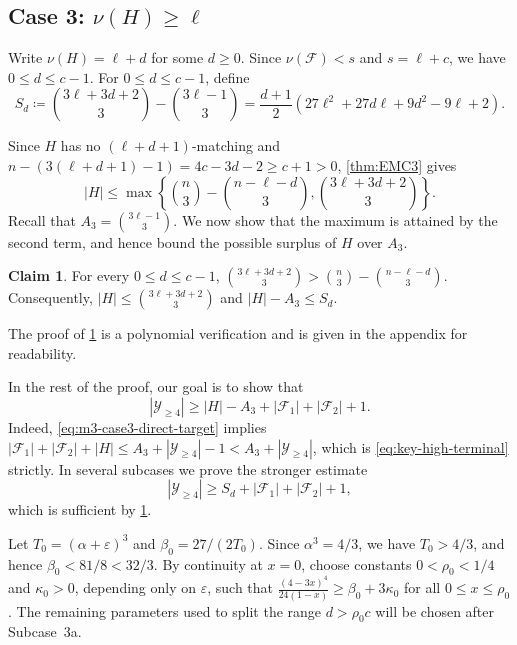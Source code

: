 \documentclass[10pt,a4paper]{article}
\numberwithin{equation}{section}
\theoremstyle{definition}
\newtheorem{claim}[claim]{Claim}
\newcommand{\F}{\mathcal F}
\newcommand{\Y}{\mathcal Y}
\begin{document}
\subsection{Case 3: $\nu(H)\ge\ell$}


Write $\nu(H)=\ell+d$ for some $d\ge0$.
Since $\nu(\F)<s$ and $s=\ell+c$, we have $0\le d\le c-1$.
For $0\le d\le c-1$, define
\begin{equation}\label{eq:Sd-exact-expansion}
        S_d\coloneqq\binom{3\ell+3d+2}{3}-\binom{3\ell-1}{3}
        =\frac{d+1}{2}
        \left(27\ell^2+27d\ell+9d^2-9\ell+2\right).
\end{equation}

Since $H$ has no $(\ell+d+1)$-matching and $n-(3(\ell+d+1)-1)=4c-3d-2\ge c+1>0$, \cref{thm:EMC3} gives
\begin{equation}\label{equ:H-maximum}
        |H|\le
        \max\left\{
        \binom n3-\binom{n-\ell-d}{3},
        \binom{3\ell+3d+2}{3}
        \right\}.
\end{equation}
Recall that $A_3=\binom{3\ell-1}{3}$.
We now show that the maximum is attained by the second term, and hence bound the possible surplus of $H$ over $A_3$.
\begin{claim}\label{clm:second-term}
        For every $0\le d\le c-1$, $\binom{3\ell+3d+2}{3}>\binom n3-\binom{n-\ell-d}{3}$.
        Consequently, $|H|\le \binom{3\ell+3d+2}{3}$ and $|H|-A_3\le S_d$.
\end{claim}
The proof of \cref{clm:second-term} is a polynomial verification and is given in the appendix for readability.


In the rest of the proof, our goal is to show that
\begin{equation}\label{eq:m3-case3-direct-target}
        |\Y_{\ge4}|
        \ge
        |H|-A_3+|\F_1|+|\F_2|+1.
\end{equation}
Indeed, \eqref{eq:m3-case3-direct-target} implies $|\F_1|+|\F_2|+|H| \le A_3+|\Y_{\ge4}|-1 <A_3+|\Y_{\ge4}|$, which is \eqref{eq:key-high-terminal} strictly.
In several subcases we prove the stronger estimate
\begin{equation}\label{eq:m3-case3-target}
        |\Y_{\ge4}|
        \ge
        S_d+|\F_1|+|\F_2|+1,
\end{equation}
which is sufficient by \cref{clm:second-term}.

\medskip

Let $T_0=(\alpha+\varepsilon)^3$ and $\beta_0=27/(2T_0)$.
Since $\alpha^3=4/3$, we have $T_0>4/3$, and hence $\beta_0<81/8<32/3$.
By continuity at $x=0$, choose constants $0<\rho_0<1/4$ and $\kappa_0>0$, depending only on $\varepsilon$, such that $\frac{(4-3x)^4}{24(1-x)}
        \ge \beta_0+3\kappa_0$ for all $0\le x\le\rho_0$.
The remaining parameters used to split the range $d>\rho_0 c$ will be chosen after Subcase~3a.
\end{document}
